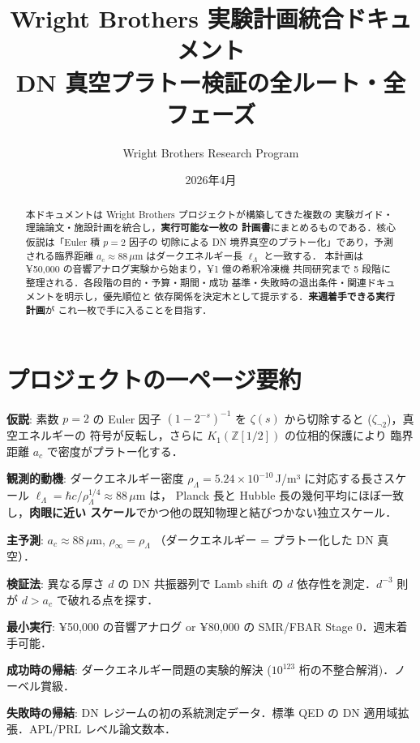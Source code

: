 \documentclass[11pt,a4paper]{article}
\title{Wright Brothers 実験計画統合ドキュメント\\
\large DN 真空プラトー検証の全ルート・全フェーズ}
\author{Wright Brothers Research Program}
\date{2026年4月}
\begin{document}
\maketitle

\begin{abstract}
本ドキュメントは Wright Brothers プロジェクトが構築してきた複数の
実験ガイド・理論論文・施設計画を統合し，\textbf{実行可能な一枚の
計画書}にまとめるものである．核心仮説は「Euler 積 $p=2$ 因子の
切除による DN 境界真空のプラトー化」であり，予測される臨界距離
$a_c \approx 88\,\mu$m はダークエネルギー長 $\ell_\Lambda$ と一致する．
本計画は ¥50,000 の音響アナログ実験から始まり，¥1 億の希釈冷凍機
共同研究まで 5 段階に整理される．各段階の目的・予算・期間・成功
基準・失敗時の退出条件・関連ドキュメントを明示し，優先順位と
依存関係を決定木として提示する．\textbf{来週着手できる実行計画}が
これ一枚で手に入ることを目指す．
\end{abstract}

\tableofcontents

\newpage
\section{プロジェクトの一ページ要約}

\begin{tcolorbox}[colback=blue!5,colframe=blue!50!black]
\textbf{仮説}: 素数 $p=2$ の Euler 因子 $(1-2^{-s})^{-1}$ を
$\zeta(s)$ から切除すると ($\zeta_{\neg 2}$)，真空エネルギーの
符号が反転し，さらに $K_1(\mathbb{Z}[1/2])$ の位相的保護により
臨界距離 $a_c$ で密度がプラトー化する．

\textbf{観測的動機}: ダークエネルギー密度 $\rho_\Lambda = 5.24
\times 10^{-10}$\,J/m³ に対応する長さスケール
$\ell_\Lambda = \hbar c/\rho_\Lambda^{1/4} \approx 88\,\mu$m は，
Planck 長と Hubble 長の幾何平均にほぼ一致し，\textbf{肉眼に近い
スケール}でかつ他の既知物理と結びつかない独立スケール．

\textbf{主予測}: $a_c \approx 88\,\mu$m, $\rho_\infty = \rho_\Lambda$
（ダークエネルギー = プラトー化した DN 真空）．

\textbf{検証法}: 異なる厚さ $d$ の DN 共振器列で Lamb shift の
$d$ 依存性を測定．$d^{-3}$ 則が $d > a_c$ で破れる点を探す．

\textbf{最小実行}: ¥50,000 の音響アナログ or ¥80,000 の SMR/FBAR
Stage 0．週末着手可能．

\textbf{成功時の帰結}: ダークエネルギー問題の実験的解決 ($10^{123}$
桁の不整合解消)．ノーベル賞級．

\textbf{失敗時の帰結}: DN レジームの初の系統測定データ．標準 QED
の DN 適用域拡張．APL/PRL レベル論文数本．
\end{tcolorbox}
\end{document}
